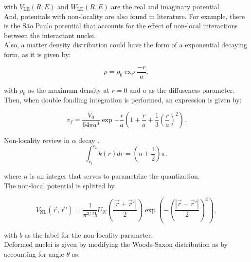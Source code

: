 \documentclass[openany]{book}
\begin{document}
with $V_\mathrm{LE}(R, E)$ and $W_\mathrm{LE}(R, E)$ are the real and imaginary potential.\\

And, potentials with non-locality are also found in literature. For example, there is the São Paulo potential that accounts for the effect of non-local interactions between the interactant nuclei. \\

Also, a matter density distribution could have the form of a exponential decaying form, as it is given by:

\begin{equation}\label{potential_nonLocal_density_exp}
	\rho = \rho_0 \exp{\frac{-r}{a}},
\end{equation}

with $\rho_0$ as the maximum density at $r = 0$ and $a$ as the diffuseness parameter. Then, when double fondling integration is performed, an expression is given by:

\begin{equation}\label{potential_nonLocal_density_vf}
	v_f = \frac{V_0}{64\pi a^3} \exp {-\frac{r}{a}} \left(1 + \frac{r}{a} + \frac{1}{3} \left(\frac{r}{a}\right)^2 \right).
\end{equation}

Non-locality review in $\alpha$ decay \cite{rojas-gamboa_velasquez_kelkar_upadhyay_2022}. \\

\begin{equation}\label{potential_nonLocal_WKB_quantization}
	\int_{r_1}^{r_2} {k(r) dr} = \left (n + \frac{1}{2} \right )\pi,
\end{equation}

where $n$ is an integer that serves to parametrize the quantization. \\

The non-local potential is splitted by 

\begin{equation}\label{potential_nonLocal_gaussian}
	V_{\mathrm{NL}} (\vec r, \vec r') = \frac{1}{\pi^{3/2}b} U_N \left( \frac{|\vec r + \vec r'|}{2}\right) \exp \left(- \left( \frac{|\vec r - \vec r'|}{2}\right)^2\right),
\end{equation}

with $b$ as the label for the non-locality parameter.\\

Deformed nuclei is given by modifying the Woods-Saxon distribution as by accounting for angle $\theta$ as:
\end{document}
